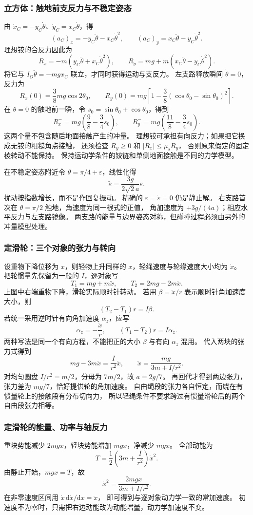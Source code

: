 \documentclass[UTF8,zihao=-4,fontset=fandol,a4paper]{ctexart}
\newcommand{\dd}{\mathrm d}
\begin{document}
\subsubsection*{立方体：触地前支反力与不稳定姿态}
由 $\dot x_C=-y_C\dot\theta$、$\dot y_C=x_C\dot\theta$，得
\[
(a_C)_x=-y_C\ddot\theta-x_C\dot\theta^2,\qquad
(a_C)_y=x_C\ddot\theta-y_C\dot\theta^2.
\]
理想铰的合反力因此为
\[
R_x=-m(y_C\ddot\theta+x_C\dot\theta^2),\qquad
R_y=mg+m(x_C\ddot\theta-y_C\dot\theta^2).
\]
将它与 $I_O\ddot\theta=-mgx_C$ 联立，才同时获得运动与支反力。
左支路释放瞬间 $\dot\theta=0$，反力为
\[
R_x(0)=\frac38mg\cos2\theta_0,
\qquad
R_y(0)=mg\left[1-\frac38(\cos\theta_0-\sin\theta_0)^2\right].
\]
在 $\theta=0$ 的触地前一瞬，令 $s_0=\sin\theta_0+\cos\theta_0$，得到
\[
R_x^-=mg\left(\frac98-\frac34s_0\right),\qquad
R_y^-=mg\left(\frac{11}{8}-\frac34s_0\right).
\]
这两个量不包含随后地面接触产生的冲量。
理想铰可承担有向反力；如果把它换成无铰的粗糙角点接触，
还须检查 $R_y\ge0$ 和 $|R_x|\le\mu_sR_y$，
否则原来假定的固定棱转动不能保持。
保持运动学条件的铰链和单侧地面接触是不同的力学模型。

在不稳定姿态附近令 $\theta=\pi/4+\varepsilon$，线性化得
\[
\ddot\varepsilon=\frac{3g}{2\sqrt2a}\varepsilon.
\]
扰动按指数增长，而不是作回复振动。
精确的 $\varepsilon=\dot\varepsilon=0$ 仍是静止解。
右支路首次在 $\theta=\pi/2$ 触地，角速度为同一根式的正值，
角加速度为 $+3g/(4a)$；相应水平反力与左支路镜像。
两支路的能量与边界姿态对称，但碰撞过程必须由另外的冲量模型处理。

\subsubsection*{定滑轮：三个对象的张力与转向}
设重物下降位移为 $x$，则轻物上升同样的 $x$，轻绳速度与轮缘速度大小均为 $\dot x$。
把轮惯量先保留为一般的 $I$，逐对象写
\[
T_1=mg+m\ddot x,\qquad T_2=2mg-2m\ddot x.
\]
上图中右端重物下降，滑轮实际顺时针转动。
若用 $\beta=\ddot x/r$ 表示顺时针角加速度大小，则
\[
(T_2-T_1)r=I\beta.
\]
若统一采用逆时针有向角加速度 $\alpha_z$，应写
\[
\alpha_z=-\frac{\ddot x}{r},\qquad
(T_1-T_2)r=I\alpha_z.
\]
两种写法是同一个有向方程，不能把正的大小 $\beta$ 与有向 $\alpha_z$ 混用。
代入两块的张力式得到
\[
mg-3m\ddot x=\frac I{r^2}\ddot x,
\qquad
\ddot x=\frac{mg}{3m+I/r^2}.
\]
对均匀圆盘 $I/r^2=m/2$，分母为 $7m/2$，故 $a=2g/7$。
再回代才得到两边张力，张力差为 $mg/7$，恰好提供轮的角加速度。
自由绳段的张力各自恒定，而绕在有惯量轮上的接触段有分布切向力，
所以轻绳条件不要求跨过有惯量滑轮后的两个自由段张力相等。

\subsubsection*{定滑轮的能量、功率与轴反力}
重块势能减少 $2mgx$，轻块势能增加 $mgx$，净减少 $mgx$。
全部动能为
\[
T=\frac12\left(3m+\frac I{r^2}\right)\dot x^2.
\]
由静止开始，$mgx=T$，故
\[
\dot x^2=\frac{2mgx}{3m+I/r^2}.
\]
在非零速度区间用 $\dot x\,\dd\dot x/\dd x=\ddot x$，
即可得到与逐对象动力学一致的常加速度。
初速度不为零时，只需把右边动能改为动能增量，动力学加速度不变。
\end{document}
